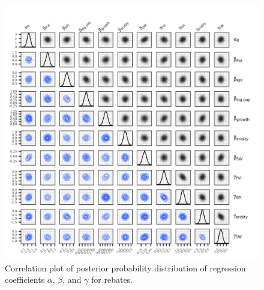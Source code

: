 \documentclass[draft]{agujournal}
\begin{document}
\begin{figure}
\includegraphics[width=6.25in]{figures_si/reb_pairs_plot-1} \caption[Correlation plot of posterior probability distribution of regression coefficients $\alpha$, $\beta$, and $\gamma$ for rebates]{Correlation plot of posterior probability distribution of regression coefficients $\alpha$, $\beta$, and $\gamma$ for rebates.}\label{fig:reb_pairs_plot}
\end{figure}



\end{document}
